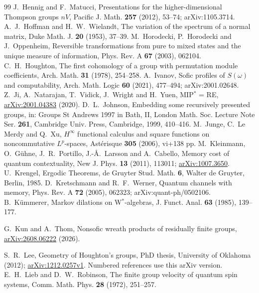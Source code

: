 \begin{thebibliography}{99}
 J.~Hennig and F.~Matucci, Presentations for the higher-dimensional Thompson groups $nV$, Pacific J. Math. \textbf{257} (2012), 53--74; arXiv:1105.3714.
 A.~J.~Hoffman and H.~W.~Wielandt, The variation of the spectrum of a normal matrix, Duke Math. J. \textbf{20} (1953), 37--39.
 M.~Horodecki, P.~Horodecki and J.~Oppenheim, Reversible transformations from pure to mixed states and the unique measure of information, Phys. Rev. A \textbf{67} (2003), 062104.
 C.~H.~Houghton, The first cohomology of a group with permutation module coefficients, Arch. Math. \textbf{31} (1978), 254--258.
 A.~Ivanov, Sofic profiles of $S(\omega)$ and computability, Arch. Math. Logic \textbf{60} (2021), 477--494; arXiv:2001.02648.
 Z.~Ji, A.~Natarajan, T.~Vidick, J.~Wright and H.~Yuen, MIP$^*$ = RE, \href{https://arxiv.org/abs/2001.04383}{arXiv:2001.04383} (2020).
 D.~L.~Johnson, Embedding some recursively presented groups, in: Groups St Andrews 1997 in Bath, II, London Math. Soc. Lecture Note Ser. \textbf{261}, Cambridge Univ. Press, Cambridge, 1999, 410--416.
 M.~Junge, C.~Le Merdy and Q.~Xu, $H^\infty$ functional calculus and square functions on noncommutative $L^p$-spaces, Ast\'erisque \textbf{305} (2006), vi+138 pp.
 M.~Kleinmann, O.~G\"uhne, J.~R.~Portillo, J.-\AA.~Larsson and A.~Cabello, Memory cost of quantum contextuality, New J. Phys. \textbf{13} (2011), 113011; \href{https://arxiv.org/abs/1007.3650}{arXiv:1007.3650}.
 U.~Krengel, Ergodic Theorems, de Gruyter Stud. Math. \textbf{6}, Walter de Gruyter, Berlin, 1985.
 D.~Kretschmann and R.~F.~Werner, Quantum channels with memory, Phys. Rev. A \textbf{72} (2005), 062323; arXiv:quant-ph/0502106.
 B.~K\"ummerer, Markov dilations on W$^*$-algebras, J. Funct. Anal. \textbf{63} (1985), 139--177.
 {\raggedright G.~Kun and A.~Thom, Nonsofic wreath products of residually finite groups, \href{https://arxiv.org/abs/2608.06222}{arXiv:2608.06222} (2026).\par}
 S.~R.~Lee, Geometry of Houghton's groups, PhD thesis, University of Oklahoma (2012); \href{https://arxiv.org/abs/1212.0257v1}{arXiv:1212.0257v1}. Numbered references use this arXiv version.
 E.~H.~Lieb and D.~W.~Robinson, The finite group velocity of quantum spin systems, Comm. Math. Phys. \textbf{28} (1972), 251--257.

\end{thebibliography}
